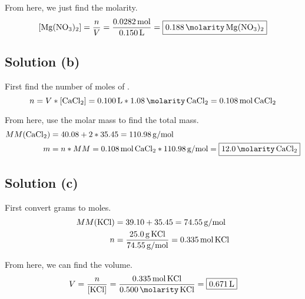 \documentclass[10pt]{article}
\begin{document}
            From here, we just find the molarity. 
            \begin{equation}
                \left[ \ce{Mg(NO3)2} \right]   =   \frac{n}{V}
                    =   \frac{0.0282\,\unit{\mole}}{0.150\,\unit{\liter}}
                    =   \boxed{0.188\,\unit{\molarity}\,\ce{Mg(NO3)2}}
            \end{equation}

        \subsection{Solution (b)}
        First find the number of moles of .
            \begin{equation}
                n   =   V * \left[ \ce{CaCl2} \right]
                    =   0.100\,\unit{\liter} * 1.08\,\unit{\molarity}\,\ce{CaCl2}
                    =   0.108\,\unit{\mole}\,\ce{CaCl2}
            \end{equation}

            From here, use the molar mass to find the total mass.
            \begin{align}
                MM(\ce{CaCl2})  &=  40.08 + 2 * 35.45
                    =   110.98\,\unit{\gram/\mole}\\
                m   &=  n * MM
                    =   0.108\,\unit{\mole}\,\ce{CaCl2} * 110.98\,\unit{\gram/\mole}
                    =   \boxed{12.0\,\unit{\molarity}\,\ce{CaCl2}}
            \end{align}

        \subsection{Solution (c)}
            First convert grams to moles.
            \begin{align}
                MM(\ce{KCl})    &=  39.10 + 35.45
                    =   74.55\,\unit{\gram/\mole}\\
                n   &=  \frac{25.0\,\unit{\gram}\,\ce{KCl}}{74.55\,\unit{\gram/\mole}}
                    =   0.335\,\unit{\mole}\,\ce{KCl}
            \end{align}

            From here, we can find the volume.
            \begin{equation}
                V   =   \frac{n}{\left[ \ce{KCl} \right]}
                    =   \frac{0.335\,\unit{\mole}\,\ce{KCl}}{0.500\,\unit{\molarity}\,\ce{KCl}}
                    =   \boxed{0.671\,\unit{\liter}}
            \end{equation}
\end{document}
